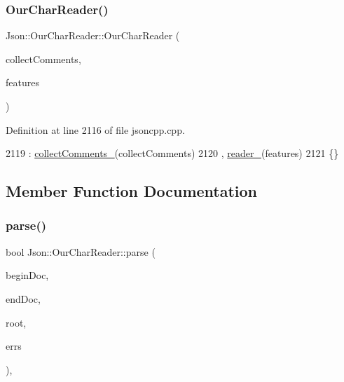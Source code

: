 \subsubsection{\texorpdfstring{Our\+Char\+Reader()}{OurCharReader()}}
{\footnotesize\ttfamily Json\+::\+Our\+Char\+Reader\+::\+Our\+Char\+Reader (\begin{DoxyParamCaption}\item[{bool}]{collect\+Comments,  }\item[{\hyperlink{class_json_1_1_our_features}{Our\+Features} const \&}]{features }\end{DoxyParamCaption})\hspace{0.3cm}{\ttfamily [inline]}}



Definition at line 2116 of file jsoncpp.\+cpp.


\begin{DoxyCode}
2119   : \hyperlink{class_json_1_1_our_char_reader_aa6afd3d0f754cadad0f6d2be38bcfee0}{collectComments\_}(collectComments)
2120   , \hyperlink{class_json_1_1_our_char_reader_aedd4520b8570654ed7aa0726075ee58d}{reader\_}(features)
2121   \{\}
\end{DoxyCode}


\subsection{Member Function Documentation}
\mbox{\label{class_json_1_1_our_char_reader_a547f08ec5a9951ca69e8bb2e90296c83}} 
\subsubsection{\texorpdfstring{parse()}{parse()}}
{\footnotesize\ttfamily bool Json\+::\+Our\+Char\+Reader\+::parse (\begin{DoxyParamCaption}\item[{char const $\ast$}]{begin\+Doc,  }\item[{char const $\ast$}]{end\+Doc,  }\item[{\hyperlink{class_json_1_1_value}{Value} $\ast$}]{root,  }\item[{\hyperlink{json_8h_a1e723f95759de062585bc4a8fd3fa4be}{J\+S\+O\+N\+C\+P\+P\+\_\+\+S\+T\+R\+I\+NG} $\ast$}]{errs }\end{DoxyParamCaption})\hspace{0.3cm}{\ttfamily [inline]}, {\ttfamily [virtual]}}



